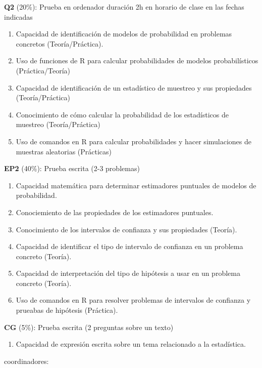 \documentclass[
]{book}
\providecommand{\tightlist}{%
  \setlength{\itemsep}{0pt}\setlength{\parskip}{0pt}}
\begin{document}
\textbf{Q2} (20\%): Prueba en ordenador duración 2h en horario de clase en las fechas indicadas

\begin{enumerate}
\def\labelenumi{\alph{enumi}.}
\tightlist
\item
  Capacidad de identificación de modelos de probabilidad en problemas concretos (Teoría/Práctica).
\item
  Uso de funciones de R para calcular probabilidades de modelos probabilísticos (Práctica/Teoría)
\item
  Capacidad de identificación de un estadístico de muestreo y sus propiedades (Teoría/Práctica)
\item
  Conocimiento de cómo calcular la probabilidad de los estadísticos de muestreo (Teoría/Práctica)
\item
  Uso de comandos en R para calcular probabilidades y hacer simulaciones de muestras aleatorias (Prácticas)
\end{enumerate}

\textbf{EP2} (40\%): Prueba escrita (2-3 problemas)

\begin{enumerate}
\def\labelenumi{\alph{enumi}.}
\tightlist
\item
  Capacidad matemática para determinar estimadores puntuales de modelos de probabilidad.
\item
  Conociemiento de las propiedades de los estimadores puntuales.
\item
  Conocimiento de los intervalos de confianza y sus propiedades (Teoría).
\item
  Capacidad de identificar el tipo de intervalo de confianza en un problema concreto (Teoría).
\item
  Capacidad de interpretación del tipo
  de hipótesis a usar en un problema concreto (Teoría).
\item
  Uso de comandos en R para resolver problemas de intervalos de confianza y prueabas de hipótesis (Práctica).
\end{enumerate}

\textbf{CG} (5\%): Prueba escrita (2 preguntas sobre un texto)

\begin{enumerate}
\def\labelenumi{\alph{enumi}.}
\tightlist
\item
  Capacidad de expresión escrita sobre un tema relacionado a la estadística.
\end{enumerate}

coordinadores:
\end{document}
